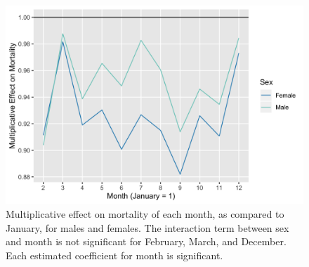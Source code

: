 \documentclass[letterpaper, 11pt]{article}
\begin{document}
\begin{figure}[ht]
    \centering
   \includegraphics[width = .6\textwidth]{../figures/month_effect.png}
   \caption{Multiplicative effect on mortality of each month, as compared to January, for males and females. The interaction term between sex and month is not significant for February, March, and December. Each estimated coefficient for month is significant.}
         \label{fig:month_eff}
\end{figure}
\end{document}
